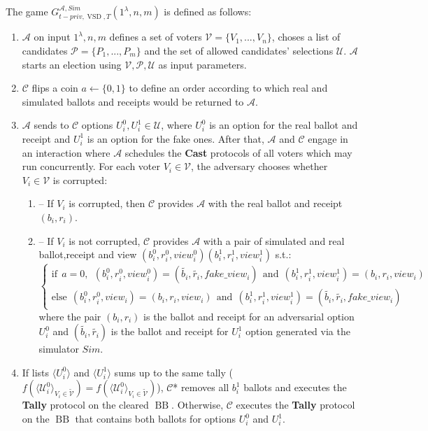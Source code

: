 \documentclass[12pt]{article}
\DeclareMathOperator{\vsd}{VSD}
\DeclareMathOperator{\bb}{BB}
\begin{document}
 
The game $G_{t-priv, \vsd,T}^{\mathcal{A},Sim}(1^{\lambda},n,m)$ is defined as follows:
\begin{enumerate} 
\item $\mathcal{A}$ on input $1^{\lambda},n,m$ defines a set of voters  $\mathcal{V} = \{V_1,...,V_n\}$, choses a list of candidates  $\mathcal{P} = \{P_1,...,P_m\}$ and the set of allowed candidates' selections $\mathcal{U}$.  $\mathcal{A}$ starts an election using $\mathcal{V}, \mathcal{P}, \mathcal{U}$ as input parameters.
\item $\mathcal{C}$ flips a coin $a \leftarrow \{0,1\}$ to define an order according to which real and simulated ballots and receipts would be returned to $\mathcal{A}$.
\item   $\mathcal{A}$ sends to  $\mathcal{C}$ options $U_i^0, U_i^1 \in  \mathcal{U}$, where $U_i^0$ is an option for the real ballot and receipt and $U_i^1$ is an option for the fake ones.  After that, $\mathcal{A}$ and $\mathcal{C}$ engage in an interaction where $\mathcal{A}$ schedules the \textbf{Cast}   protocols of all voters which may run concurrently. For each voter $V_i \in \mathcal{V}$, the adversary chooses whether $V_i \in \mathcal{V}$ is corrupted: 
\begin{enumerate}
\item[] -- If $V_i$ is corrupted, then $\mathcal{C}$ provides $\mathcal{A}$ with the real ballot and receipt $(b_i,r_i)$.
\item[] --  If $V_i$ is not corrupted, $\mathcal{C}$  provides $\mathcal{A}$ with a pair of simulated and real ballot,receipt and view $(b_i^0, r_i^0,view_i^0) (b_i^1, r_i^1,view_i^1)$ s.t.:\\
$ \begin{cases}
 \text{if} ~~a =0,~~ (b_i^0,r_i^0,view_i^0) = (\tilde{b_i},\tilde{r_i},fake\_view_i) ~~ \text{and} ~~  (b_i^1,r_i^1,view_i^1) = (b_i,r_i,view_i)   \\ 
 \text{else}~~ (b_i^0,r_i^0,view_i) =(b_i,r_i,view_i)~~  \text{and} ~~  (b_i^1,r_i^1,view_i^1) =(\tilde{b_i},\tilde{r_i},fake\_view_i)
\end{cases}$\\ 
where the pair $(b_i, r_i)$ is the ballot and receipt for an adversarial option $U_i^0$ and $(\tilde{b_i},\tilde{r_i})$ is the ballot and receipt for  $U_i^1$ option generated via the simulator $Sim$.
\end{enumerate}
\item If lists $\langle U^0_i \rangle$ and $\langle U^1_i \rangle$ sums up to the same tally ( $f(\langle \mathcal{U}^0_i \rangle _{V_i \in \tilde{\mathcal{V}}} ) = f(\langle \mathcal{U}^0_i \rangle _{V_i \in \tilde{\mathcal{V}}})$), $\mathcal{C}$* removes all $b_i^1$ ballots and executes the \textbf{Tally} protocol on the cleared $\bb$. Otherwise, $\mathcal{C}$ executes the \textbf{Tally} protocol on the $\bb$ that contains both ballots for options $U_i^0$ and $U_i^1$. 

\end{enumerate}
\end{document}
